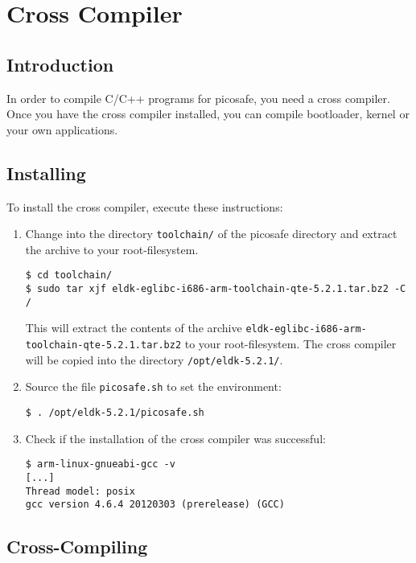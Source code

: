 \chapter{Cross Compiler}

\section{Introduction}

In order to compile C/C++ programs for picosafe, you need a cross compiler.
Once you have the cross compiler installed, you can compile bootloader, kernel
or your own applications.

\section{Installing}

To install the cross compiler, execute these instructions:

\begin{enumerate}
\item Change into the directory \texttt{toolchain/} of the picosafe directory and extract the archive to your root-filesystem.

\texttt{\$ cd toolchain/} \\
\texttt{\$ sudo tar xjf eldk-eglibc-i686-arm-toolchain-qte-5.2.1.tar.bz2 -C /}

This will extract the contents of the archive \texttt{eldk-eglibc-i686-arm-toolchain-qte-5.2.1.tar.bz2} to your root-filesystem. The cross compiler will be copied into the directory \texttt{/opt/eldk-5.2.1/}.

\item Source the file \texttt{picosafe.sh} to set the environment:

\texttt{\$ . /opt/eldk-5.2.1/picosafe.sh}

\item Check if the installation of the cross compiler was successful:

\texttt{\$ arm-linux-gnueabi-gcc -v} \\
\texttt{[...]} \\
\texttt{Thread model: posix} \\
\texttt{gcc version 4.6.4 20120303 (prerelease) (GCC)}
\end{enumerate}

\section{Cross-Compiling}

